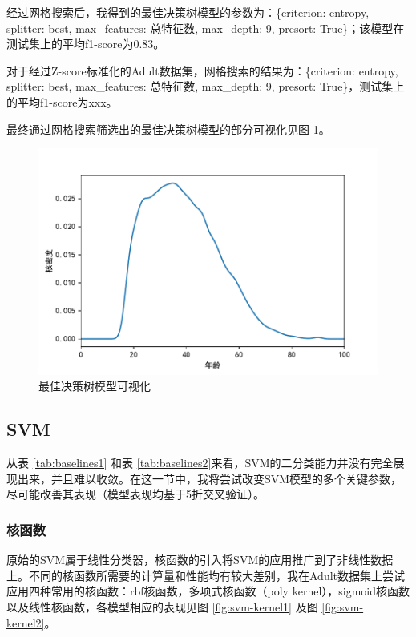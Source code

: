 \documentclass[12pt,a4paper]{article}
\theoremstyle{definition}
\begin{document}
经过网格搜索后，我得到的最佳决策树模型的参数为：\{criterion: entropy, splitter: best, max\_features: 总特征数, max\_depth: 9, presort: True\}；该模型在测试集上的平均f1-score为0.83。

对于经过Z-score标准化的Adult数据集，网格搜索的结果为：\{criterion: entropy, splitter: best, max\_features: 总特征数, max\_depth: 9, presort: True\}，测试集上的平均f1-score为xxx。

\vspace{0.01\linewidth}
最终通过网格搜索筛选出的最佳决策树模型的部分可视化见图 \ref{fig:dt-best-vis}。

\begin{figure}[H]
	\centering
	\includegraphics[width=0.9\linewidth]{img/age_dis.pdf}
	\caption{最佳决策树模型可视化}
	\label{fig:dt-best-vis}
\end{figure}

\subsection{SVM}

从表 \ref{tab:baselines1} 和表 \ref{tab:baselines2}来看，SVM的二分类能力并没有完全展现出来，并且难以收敛。在这一节中，我将尝试改变SVM模型的多个关键参数，尽可能改善其表现（模型表现均基于5折交叉验证）。

\subsubsection{核函数}

原始的SVM属于线性分类器，核函数的引入将SVM的应用推广到了非线性数据上。不同的核函数所需要的计算量和性能均有较大差别，我在Adult数据集上尝试应用四种常用的核函数：rbf核函数，多项式核函数（poly kernel），sigmoid核函数以及线性核函数，各模型相应的表现见图 \ref{fig:svm-kernel1} 及图 \ref{fig:svm-kernel2}。
\end{document}
